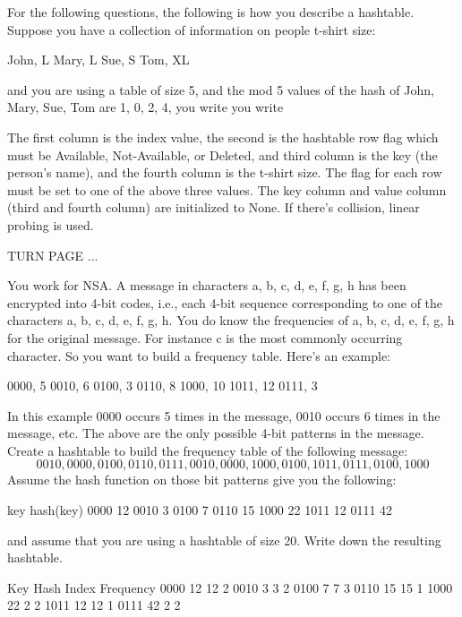 

For the following questions,
the following is how you describe a hashtable.
Suppose you have a collection of information on
people t-shirt size:
\begin{console}[fontsize=\footnotesize]
John, L
Mary, L
Sue, S
Tom, XL
\end{console}
and you are using a table of size 5, and
the mod 5 values of the hash of John, Mary, Sue, Tom are
1, 0, 2, 4, you write
you write
\begin{console}
\end{console}
The first column is the index value, the second is the hashtable row flag
which must be Available, Not-Available, or Deleted,
and third column is the key (the person's name),
and the fourth column is the t-shirt size.
The flag for each row must be set to one of the above three values.
The key column and value column (third and fourth column) are initialized
to None.
If there's collision, linear probing is used.

TURN PAGE ...

\newpage
\nextq
You work for NSA.
A message in characters a, b, c, d, e, f, g, h has been encrypted into 4-bit
codes, i.e.,
each 4-bit sequence corresponding to one of the characters
a, b, c, d, e, f, g, h.
You do know the frequencies of a, b, c, d, e, f, g, h for the original message.
For instance c is the most commonly occurring character.
So you want to build a frequency table.
Here's an example:
\begin{console}[fontsize=\footnotesize]
0000, 5
0010, 6
0100, 3
0110, 8
1000, 10
1011, 12
0111, 3
\end{console}
In this example 0000 occurs 5 times in the message, 0010 occurs 6 times in the
message, etc.
The above are the only possible 4-bit patterns in the message.
Create a hashtable to build the frequency table of the following
message:
\[
0010, 0000, 0100, 0110, 0111, 0010, 0000, 1000, 0100, 1011, 0111, 0100, 1000
\]
Assume the hash function on those bit patterns give you the following:
\begin{console}[fontsize=\footnotesize]
key   hash(key)
0000  12
0010  3
0100  7
0110  15
1000  22
1011  12
0111  42
\end{console}
and assume that you are using a hashtable of size 20.
Write down the resulting hashtable.
\\
\ANSWER
\begin{answercode}
Key   Hash  Index  Frequency
0000  12    12     2
0010  3     3      2
0100  7     7      3
0110  15    15     1
1000  22    2      2
1011  12    12     1
0111  42    2      2
\end{answercode}

